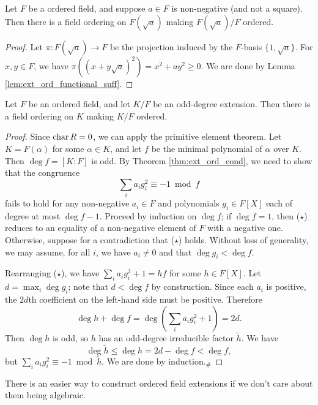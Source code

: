 \begin{corollary}
  \label{cor:ext_ord_to_adj_sqrt}
  \leanok
  Let $F$ be a ordered field, and suppose $a\in F$ is non-negative (and not a square). Then there is a field ordering on $F(\sqrt{a})$ making $F(\sqrt{a})/F$ ordered.
\end{corollary}
\begin{proof}
  \leanok
  Let $\pi:F(\sqrt{a})\to F$ be the projection induced by the $F$-basis $\{1,\sqrt{a}\}$. For $x,y\in F$, we have $\pi((x+y\sqrt{a})^2)=x^2+ay^2\geq0$. We are done by Lemma \ref{lem:ext_ord_functional_suff}.
\end{proof}

\begin{lemma}
  \label{lem:ext_ord_odd_deg}
  \leanok
  Let $F$ be an ordered field, and let $K/F$ be an odd-degree extension. Then there is a field ordering on $K$ making $K/F$ ordered.
\end{lemma}
\begin{proof}
  \leanok
  Since $\operatorname{char} R=0$, we can apply the primitive element theorem. Let $K=F(\alpha)$ for some $\alpha\in K$, and let $f$ be the minimal polynomial of $\alpha$ over $K$. Then $\deg f=[K:F]$ is odd. By Theorem \ref{thm:ext_ord_cond}, we need to show that the congruence
  \[\sum_ia_ig_i^2\equiv-1\bmod f\tag{$\star$}\]
  fails to hold for any non-negative $a_i\in F$ and polynomials $g_i\in F[X]$ each of degree at most $\deg f-1$. Proceed by induction on $\deg f$; if $\deg f=1$, then ($\star$) reduces to an equality of a non-negative element of $F$ with a negative one. Otherwise, suppose for a contradiction that ($\star$) holds. Without loss of generality, we may assume, for all $i$, we have $a_i\neq0$ and that $\deg g_i<\deg f$.
  
  Rearranging ($\star$), we have $\sum_ia_ig_i^2+1=hf$ for some $h\in F[X]$. Let $d=\max_i\deg g_i$; note that $d<\deg f$ by construction. Since each $a_i$ is positive, the $2d$th coefficient on the left-hand side must be positive. Therefore
  \[\deg h+\deg f=\deg\left(\sum_ia_ig_i^2+1\right)=2d.\]
  Then $\deg h$ is odd, so $h$ has an odd-degree irreducible factor $\tilde h$. We have
  \[\deg\tilde h\leq\deg h=2d-\deg f<\deg f,\]
  but $\sum_ia_ig_i^2\equiv-1\bmod\tilde h$. We are done by induction.$_\#$
\end{proof}

There is an easier way to construct ordered field extensions if we don't care about them being algebraic.

